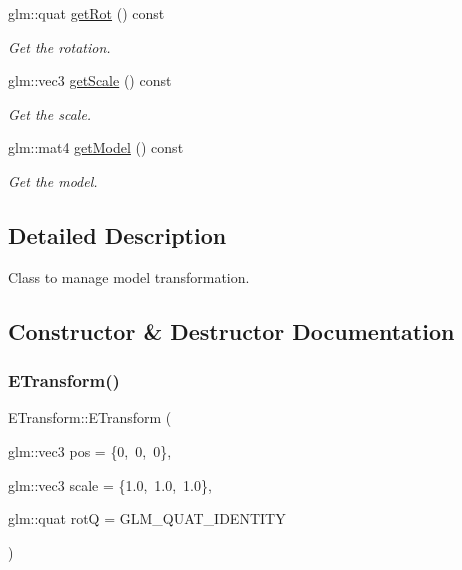 \begin{DoxyCompactItemize}
glm\+::quat \hyperlink{class_e_transform_a86b9bd6c0062f35644db55095395bd95}{get\+Rot} () const
\begin{DoxyCompactList}\small\item\em Get the rotation. \end{DoxyCompactList}\item 
glm\+::vec3 \hyperlink{class_e_transform_addf4879d7d3eaad7448101aa494b3fac}{get\+Scale} () const
\begin{DoxyCompactList}\small\item\em Get the scale. \end{DoxyCompactList}\item 
glm\+::mat4 \hyperlink{class_e_transform_a9a1340274193c42a85372c9d511f208f}{get\+Model} () const
\begin{DoxyCompactList}\small\item\em Get the model. \end{DoxyCompactList}\end{DoxyCompactItemize}


\subsection{Detailed Description}
Class to manage model transformation. 

\subsection{Constructor \& Destructor Documentation}
\mbox{\label{class_e_transform_a02d0c5c497192db1a52b56354a9c595a}} 
\subsubsection{\texorpdfstring{E\+Transform()}{ETransform()}\hspace{0.1cm}{\footnotesize\ttfamily [1/4]}}
{\footnotesize\ttfamily E\+Transform\+::\+E\+Transform (\begin{DoxyParamCaption}\item[{glm\+::vec3}]{pos = {\ttfamily \{0,~0,~0\}},  }\item[{glm\+::vec3}]{scale = {\ttfamily \{1.0,~1.0,~1.0\}},  }\item[{glm\+::quat}]{rotQ = {\ttfamily GLM\+\_\+QUAT\+\_\+IDENTITY} }\end{DoxyParamCaption})}



